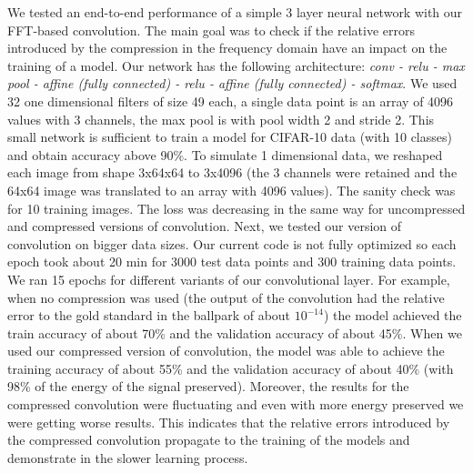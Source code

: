 We tested an end-to-end performance of a simple 3 layer neural network with our FFT-based convolution. The main goal was to check if the relative errors introduced by the compression in the frequency domain have an impact on the training of a model. Our network has the following architecture: \textit{conv - relu - max pool - affine (fully connected) - relu - affine (fully connected) - softmax}. We used 32 one dimensional filters of size 49 each, a single data point is an array of 4096 values with 3 channels, the max pool is with pool width 2 and stride 2. This small network is sufficient to train a model for CIFAR-10 data (with 10 classes) and obtain accuracy above 90\%. To simulate 1 dimensional data, we reshaped each image from shape 3x64x64 to 3x4096 (the 3 channels were retained and the 64x64 image was translated to an array with 4096 values). The sanity check was for 10 training images. The loss was decreasing in the same way for uncompressed and compressed versions of convolution. Next, we tested our version of convolution on bigger data sizes. Our current code is not fully optimized so each epoch took about 20 min for 3000 test data points and 300 training data points. We ran 15 epochs for different variants of our convolutional layer. For example, when no compression was used (the output of the convolution had the relative error to the gold standard in the ballpark of about $10^{-14}$) the model achieved the train accuracy of about 70\% and the validation accuracy of about 45\%. When we used our compressed version of convolution, the model was able to achieve the training accuracy of about 55\% and the validation accuracy of about 40\% (with 98\% of the energy of the signal preserved). Moreover, the results for the compressed convolution were fluctuating and even with more energy preserved we were getting worse results. This indicates that the relative errors introduced by the compressed convolution propagate to the training of the models and demonstrate in the slower learning process.

